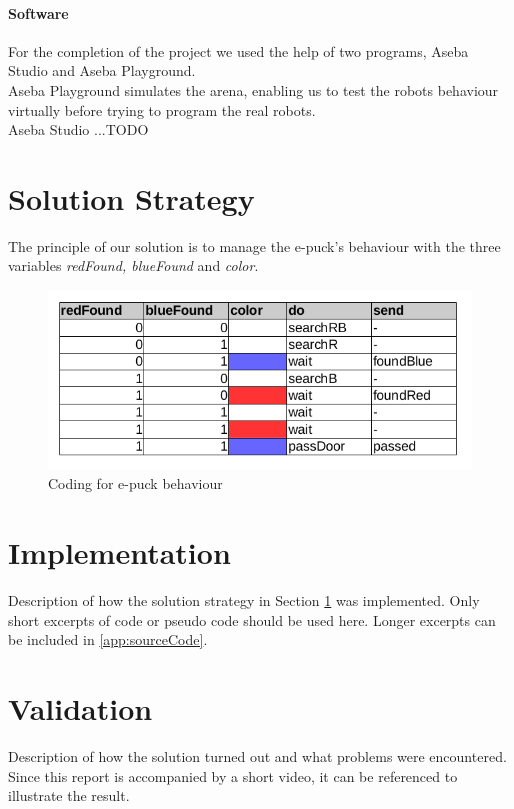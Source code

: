 \documentclass[12pt,a4paper]{article}
\begin{document}
\paragraph{Software}
For the completion of the project we used the help of two programs, Aseba Studio and Aseba Playground.\\
Aseba Playground simulates the arena, enabling us to test the robots behaviour virtually before trying to program the real robots.\\
Aseba Studio ...TODO


\section{Solution Strategy} \label{sec:solStrategy}
The principle of our solution is to manage the e-puck's behaviour with the three variables \textit{redFound, blueFound} and \textit{color}. 

\begin{figure}[h!]
\begin{center}
\includegraphics[scale=0.5]{images/behaviourCode.png}
\caption{Coding for e-puck behaviour}
\label{fig:behaviour code}
\end{center}
\end{figure}



\section{Implementation}
Description of how the solution strategy in Section \ref{sec:solStrategy} was implemented. Only short excerpts of code or pseudo code should be used here. Longer excerpts can be included in \ref{app:sourceCode}.

\section{Validation}
Description of how the solution turned out and what problems were encountered. Since this report is accompanied by a short video, it can be referenced to illustrate the result.
\end{document}
